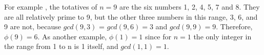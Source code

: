\begin{appendices}
\begin{example}
  For example \cite{wiki:eulerfunction}, the totatives of $n = 9$ are
  the six numbers 1, 2, 4, 5, 
  7 and 8. They are all relatively prime to 9, but the other three
  numbers in this range, 3, 6, and 9 are not, because
  $gcd\left(9, 3\right)$ =
  $gcd\left(9, 6\right) = 3$ and $gcd\left(9, 9\right) = 9$.
  Therefore, $\phi\left(9\right) = 6$. As another
  example, $\phi\left(1\right) = 1$ since for $n = 1$ the only integer in the range from
  1 to n is 1 itself, and $gcd\left(1, 1\right) = 1$. 
\end{example}

\end{appendices}
